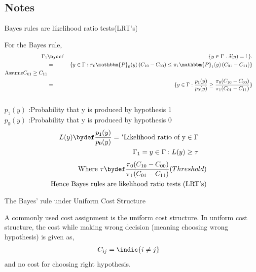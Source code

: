 \documentclass[12pt]{report}
\begin{document}
\begin{itemize}
\section{Notes}
\begin{note}
Bayes rules are likelihood ratio tests(LRT's)
\end{note}
For the Bayes rule, \\
\begin{eqnarray}
\centering
\nonumber
\Gamma_1 &\bydef& \{y \in \Gamma: \delta(y) = 1\}.\\
%
\nonumber
&=&\{y \in \Gamma: \pi_0  \mathbbm{P}_0(y) \left(C_{10}-C_{00} \right) \leq \pi_1  \mathbbm{P}_1(y) \left(C_{01}-C_{11} \right)\}\\
\nonumber
\text{Assume}C_{01} \ge C_{11}\\
\nonumber
&=&\{y \in \Gamma: \frac{p_1(y)}{p_0(y)} \geq  \frac{\pi_0 (C_{10}-C_{00} )}{\pi_1 (C_{01}-C_{11} )}\}\\
\nonumber
\end{eqnarray}
$p_1(y)$ :Probability that y is produced by hypothesis 1\\
$p_0(y)$ :Probability that y is produced by hypothesis 0\\
\begin{align*}
\noindent
L(y) \bydef \frac{p_1(y)}{p_0(y)} = \text{"Likelihood ratio of y} \in \Gamma \\
\noindent
\Gamma_1 = {y \in \Gamma : L(y) \geq \tau }\\
\end{align*}
\begin{align*}
\noindent
\text{Where      }  
 \tau \bydef \frac{\pi_0 (C_{10}-C_{00})}{\pi_1 (C_{01}-C_{11})} (Threshold)\\
\noindent
\text {Hence Bayes rules are likelihood ratio tests (LRT's)} 
\end{align*}
\begin{note}
The Bayes' rule under Uniform Cost Structure
\end{note}
A commonly used cost assignment is the uniform cost structure. In uniform cost structure, the cost while making wrong decision (meaning choosing wrong hypothesis) is given as, 
\begin{align*}
 C_{ij} =  \indic{i \ne j}  \\
\end{align*}
 and no cost for choosing right hypothesis.


\end{itemize}
\end{document}
